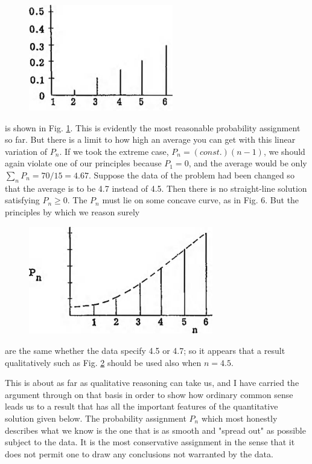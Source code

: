 \documentclass[]{article}
\begin{document}
\begin{figure}
    \centering
    \includegraphics[width=2.48031in,height=1.82283in]{media/image5.jpeg}
    \caption{}
    \label{fig-five}
\end{figure}
is
shown in Fig. \ref{fig-five}. This is evidently the most reasonable probability
assignment so far. But there is a limit to how high an average you can
get with this linear variation of \(P_{n}\). If we took the extreme
case, \(P_{n} = (const.)(n - 1)\), we should again violate one of our
principles because \(P_{1} = 0\), and the average would be only
\(\sum_{n}^{}{P_{n} = 70/15} = 4.67\). Suppose the data of the problem
had been changed so that the average is to be 4.7 instead of 4.5. Then
there is no straight-line solution satisfying \(P_{n} \geq 0\). The
\(P_{n}\) must lie on some concave curve, as in Fig. 6. But the
principles by which we reason
surely
\begin{figure}
    \centering
    \includegraphics[width=3.16535in,height=1.84252in]{media/image6.jpeg}
    \caption{}
    \label{fig-six}
\end{figure}
%
are the same whether the data specify 4.5 or 4.7; so it appears that a
result qualitatively such as Fig. \ref{fig-six} should be used also when
\(n = 4.5\).

This is about as far as qualitative reasoning can take us, and I have carried the argument through on that basis in order to show how ordinary common sense leads us to a result that has all the important features of the quantitative solution given below. The probability assignment $P _{ n }$ which most honestly describes what we know is the one that is as smooth and "spread out" as possible subject to the data. It is the most conservative assignment in the sense that it does not permit one to draw any conclusions not warranted by the data.
\end{document}
